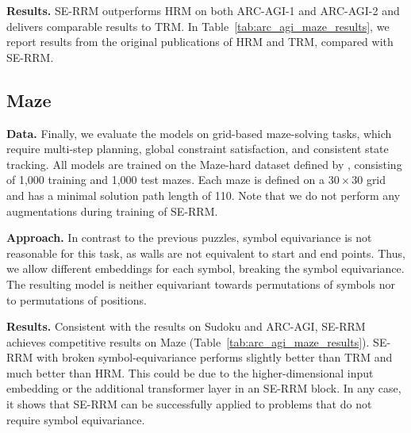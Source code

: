 \documentclass{article}
\theoremstyle{plain}
\theoremstyle{definition}
\theoremstyle{remark}
\renewcommand{\paragraph}[1]{\textbf{#1}\;}
\begin{document}
\paragraph{Results.} SE-RRM outperforms HRM on both ARC-AGI-1 and ARC-AGI-2 and delivers comparable results to TRM. In Table~\ref{tab:arc_agi_maze_results}, we report results from the original publications of HRM and TRM, compared with SE-RRM. 

\subsection{Maze}
\paragraph{Data.} Finally, we evaluate the models on grid-based maze-solving tasks, which require multi-step planning, global constraint satisfaction, 
and consistent state tracking.
All models are trained on the Maze-hard dataset defined by \citet{wang2025hierarchical}, consisting of 1,000 training and 1,000 test mazes.
Each maze is defined on a $30\times 30$ grid and has a minimal solution path length of 110.
Note that we do not perform any augmentations during training of SE-RRM.

\paragraph{Approach.}
In contrast to the previous puzzles, symbol equivariance is not reasonable for this task, as walls are not equivalent to start and end points.
Thus, we allow different embeddings for each symbol, breaking the symbol equivariance. The resulting model is neither equivariant towards permutations of symbols nor to permutations of positions. 


\paragraph{Results.}
Consistent with the results on Sudoku and ARC-AGI, 
SE-RRM achieves competitive results on Maze (Table~\ref{tab:arc_agi_maze_results}).
SE-RRM with broken symbol-equivariance performs slightly better than TRM and much better than HRM. This could be due to the higher-dimensional input embedding or the additional transformer layer in an SE-RRM block. In any case, it shows that SE-RRM can be successfully applied to problems that do not require symbol equivariance.
\end{document}
